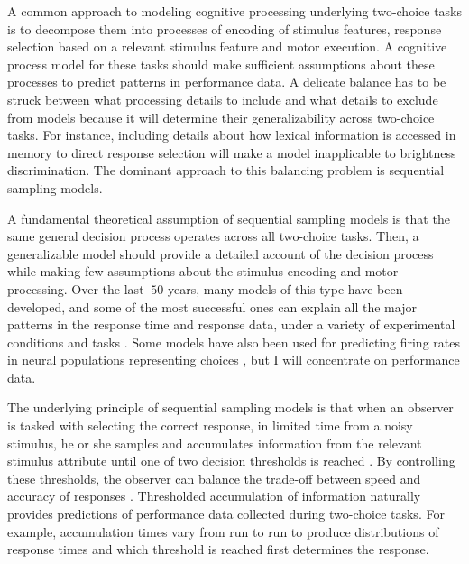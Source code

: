 \documentclass[12pt]{article}
\begin{document}
A common approach to modeling cognitive processing underlying two-choice
tasks is to decompose them into processes of encoding of stimulus features, response selection based on a relevant stimulus feature and motor execution. A cognitive process model for these tasks should make sufficient assumptions about these processes to predict patterns in performance
data. A delicate balance has to be struck between what processing details to include
and what details to exclude from models  because it will determine their generalizability across two-choice tasks. For instance, including details about how lexical information is accessed in
memory to direct response selection will make a model inapplicable to
brightness discrimination. The dominant approach to this balancing problem
is sequential sampling models.
    
A fundamental theoretical assumption of sequential sampling models
is that the same general decision process operates across all two-choice
tasks. Then, a generalizable model should provide a detailed account of the
decision process while making few assumptions about the stimulus encoding
and motor processing. Over the last $~50$ years, many models of this type
have been developed, and some of the most successful ones
can explain all the major patterns in the response time and response data,
under a variety of experimental conditions and tasks
\citep{Sto1960,Rat1978,RatTue2002,Smi1995,UshMcc2001,BroHea2008}. Some
models have also been used for predicting firing rates in neural
populations representing choices
\citep{RatChe2003,RatHas2011,SmiRat2004,Bog2007}, but I will concentrate on
performance data.
    
The underlying principle of sequential sampling models is that when an
observer is tasked with selecting the correct response, in limited time
from a noisy stimulus, he or she samples and accumulates
information from the relevant stimulus attribute until one of two
decision thresholds is reached
\citep{Sto1960,Edw1965,Pik1973,Rat1978,UshMcc2001,RatSmi2004,SmiRat2004,
RatMck2008,Wag2009,Luc1986,TowAsh1983,BogBro2006}. By controlling
these thresholds, the observer can balance the trade-off between
speed and accuracy of responses \citep{BogWag2010}. Thresholded accumulation of information naturally provides
predictions of performance data collected during two-choice
tasks. For example, accumulation times vary from run to run to produce distributions of
response times and which threshold is reached first determines the
response.
    
\end{document}
